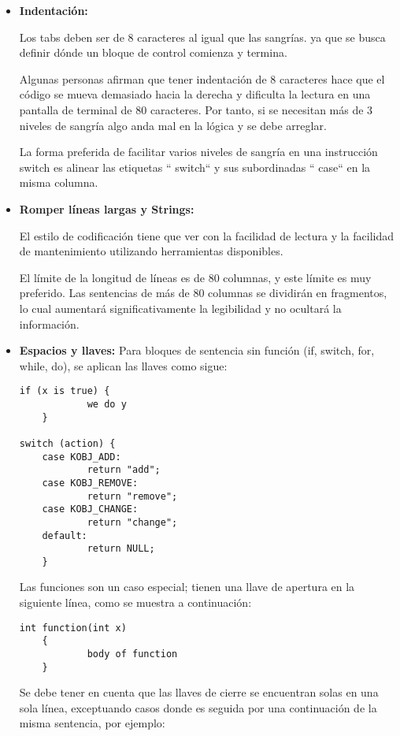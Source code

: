 \begin{itemize}

\item\textbf{Indentación:}
{Los tabs deben ser de 8 caracteres al igual que las sangrías. ya que se busca definir dónde un bloque de control comienza y termina. 

Algunas personas afirman que tener indentación de 8 caracteres hace que el código se mueva demasiado hacia la derecha y dificulta la lectura en una pantalla de terminal de 80 caracteres. Por tanto, si se necesitan más de 3 niveles de sangría algo anda mal en la lógica y se debe arreglar.

La forma preferida de facilitar varios niveles de sangría en una instrucción switch es alinear las etiquetas `` switch`` y sus subordinadas `` case`` en la misma columna.}

\item\textbf{Romper líneas largas y Strings:}
{El estilo de codificación tiene que ver con la facilidad de lectura y la facilidad de mantenimiento utilizando herramientas disponibles.

El límite de la longitud de líneas es de 80 columnas, y este límite es muy preferido. Las sentencias de más de 80 columnas se dividirán en fragmentos, lo cual aumentará significativamente la legibilidad y no ocultará la información.}

\item\textbf{Espacios y llaves:}
Para bloques de sentencia sin función (if, switch, for, while, do), se aplican las llaves como sigue:

\begin{verbatim}
if (x is true) {
    	    we do y
	}

switch (action) {
	case KOBJ_ADD:
	        return "add";
	case KOBJ_REMOVE:
	        return "remove";
	case KOBJ_CHANGE:
	        return "change";
	default:
    	    return NULL;
	}
\end{verbatim}


{Las funciones son un caso especial; tienen una llave de apertura en la siguiente línea, como se muestra a continuación:}

\begin{verbatim}
int function(int x)
	{
	        body of function
	}
\end{verbatim}

{Se debe tener en cuenta que las llaves de cierre se encuentran solas en una sola línea, exceptuando casos donde es seguida por una continuación de la misma sentencia, por ejemplo:}


\end{itemize}
